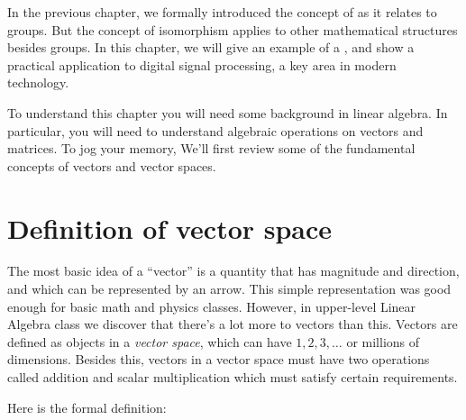 
In the previous chapter, we formally introduced the concept of  as it relates to groups. But the concept of isomorphism  applies to other mathematical structures besides groups. In this chapter, we will give an example of a , and show a practical application  to  digital  signal processing, a key area in modern technology. 

To understand this chapter you will need some background in linear algebra. In particular, you will need to understand algebraic operations on vectors and matrices. To jog your memory,  We'll first review some of the fundamental concepts of vectors and vector spaces. 

\section{Definition of  vector space}
The most basic idea of a ``vector'' is  a quantity that has magnitude and direction, and which can be represented by an arrow. This simple representation was good enough for basic math and physics classes. However, in upper-level Linear Algebra class we discover that there's a lot more to vectors than this. Vectors are defined as objects in a \emph{vector space}, which can have $1,2,3, \ldots$ or millions of dimensions. Besides this, vectors in a vector space must have two operations called addition and scalar multiplication which must satisfy certain requirements. 

Here is the formal definition:

